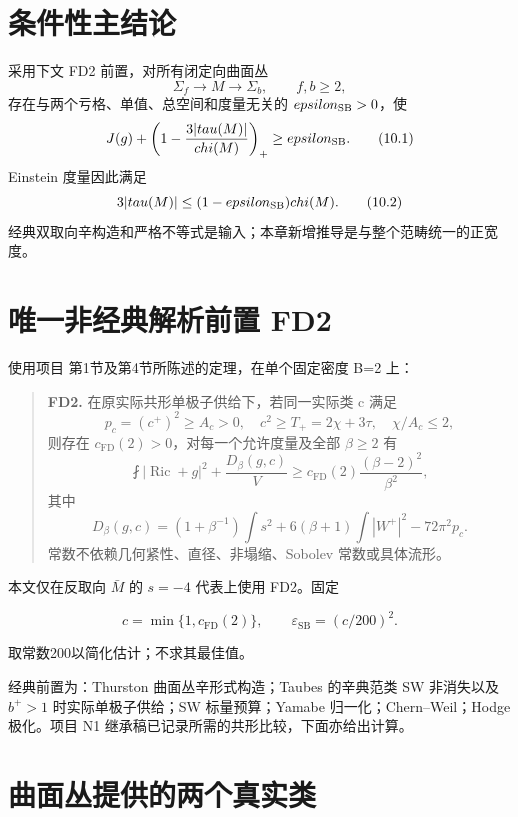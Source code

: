 \documentclass[UTF8,11pt,openany,oneside,fontset=none]{ctexbook}
\begin{document}
\section{条件性主结论}\label{ch10:ux6761ux4ef6ux6027ux4e3bux7ed3ux8bba}

采用下文 FD2 前置，对所有闭定向曲面丛 \[
\Sigma_f\longrightarrow M\longrightarrow\Sigma_b,\qquad f,b\ge2,
\] 存在与两个亏格、单值、总空间和度量无关的 \(\varepsilon_{\rm SB}>0\)，使 \[
\mathcal J(g)+\left(1-\frac{3|\tau(M)|}{\chi(M)}\right)_+
\ge\varepsilon_{\rm SB}.\tag{10.1}\label{eq:r10:1}
\] Einstein 度量因此满足 \[
3|\tau(M)|\le(1-\varepsilon_{\rm SB})\chi(M).\tag{10.2}\label{eq:r10:2}
\] 经典双取向辛构造和严格不等式是输入；本章新增推导是与整个范畴统一的正宽度。\cite{Kotschick,LeBrunKodaira}

\section{唯一非经典解析前置 FD2}\label{ch10:ux552fux4e00ux975eux7ecfux5178ux89e3ux6790ux524dux7f6e-fd2}

使用项目  第1节及第4节所陈述的定理，在单个固定密度 B=2 上：

\begin{quote}
\textbf{FD2.} 在原实际共形单极子供给下，若同一实际类 c 满足 \[
p_c=(c^+)^2\ge A_c>0,\quad c^2\ge T_+=2\chi+3\tau,
\quad\chi/A_c\le2,
\] 则存在 \(c_{\mathrm{FD}}(2)>0\)，对每一个允许度量及全部 \(\beta\ge2\) 有 \[
\fint|\operatorname{Ric}+g|^2+\frac{D_\beta(g,c)}V
\ge c_{\mathrm{FD}}(2)\frac{(\beta-2)^2}{\beta^2},
\] 其中 \[
D_\beta(g,c)=(1+\beta^{-1})\int s^2
+6(\beta+1)\int|W^+|^2-72\pi^2p_c.
\] 常数不依赖几何紧性、直径、非塌缩、Sobolev 常数或具体流形。
\end{quote}

本文仅在反取向 \(\bar M\) 的 \(s=-4\) 代表上使用 FD2。固定

\[
c=\min\{1,c_{\mathrm{FD}}(2)\},\qquad
\boxed{\varepsilon_{\mathrm{SB}}=(c/200)^2.}
\tag{10.3}\label{eq:r10:3}
\]

取常数200以简化估计；不求其最佳值。

经典前置为：Thurston 曲面丛辛形式构造；Taubes 的辛典范类 SW 非消失以及 \(b^+>1\) 时实际单极子供给；SW 标量预算；Yamabe 归一化；Chern--Weil；Hodge 极化。项目 N1 继承稿已记录所需的共形比较，下面亦给出计算。

\section{曲面丛提供的两个真实类}\label{ch10:ux66f2ux9762ux4e1bux63d0ux4f9bux7684ux4e24ux4e2aux771fux5b9eux7c7b}
\end{document}
